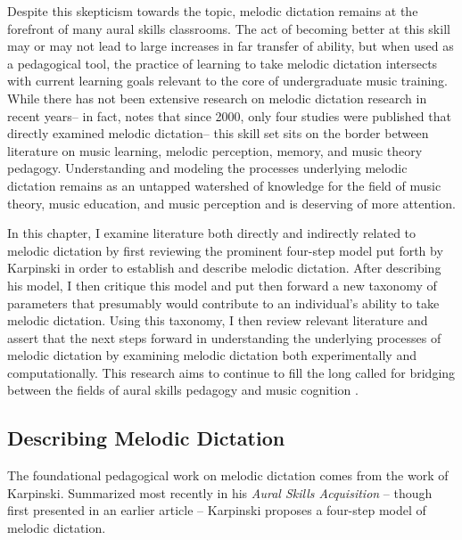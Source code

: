 \documentclass[12pt,]{book}
\begin{document}
Despite this skepticism towards the topic, melodic dictation remains at the forefront of many aural skills classrooms.
The act of becoming better at this skill may or may not lead to large increases in far transfer of ability, but when used as a pedagogical tool, the practice of learning to take melodic dictation intersects with current learning goals relevant to the core of undergraduate music training.
While there has not been extensive research on melodic dictation research in recent years-- in fact, \citet{paneyEffectDirectingAttention2016} notes that since 2000, only four studies were published that directly examined melodic dictation-- this skill set sits on the border between literature on music learning, melodic perception, memory, and music theory pedagogy.
Understanding and modeling the processes underlying melodic dictation remains as an untapped watershed of knowledge for the field of music theory, music education, and music perception and is deserving of more attention.

In this chapter, I examine literature both directly and indirectly related to melodic dictation by first reviewing the prominent four-step model put forth by Karpinski in order to establish and describe melodic dictation.
After describing his model, I then critique this model and put then forward a new taxonomy of parameters that presumably would contribute to an individual's ability to take melodic dictation.
Using this taxonomy, I then review relevant literature and assert that the next steps forward in understanding the underlying processes of melodic dictation by examining melodic dictation both experimentally and computationally.
This research aims to continue to fill the long called for bridging between the fields of aural skills pedagogy and music cognition \citep{davidbutlerWhyGulfMusic1997a, karpinskiAuralSkillsAcquisition2000, klonoskiPerceptualLearningHierarchy2000}.

\hypertarget{describing-melodic-dictation}{%
\subsection{Describing Melodic Dictation}\label{describing-melodic-dictation}}

The foundational pedagogical work on melodic dictation comes from the work of Karpinski.
Summarized most recently in his \emph{Aural Skills Acquisition} \citep{karpinskiAuralSkillsAcquisition2000}-- though first presented in an earlier article \citep{karpinskiModelMusicPerception1990}-- Karpinski proposes a four-step model of melodic dictation.
\end{document}
